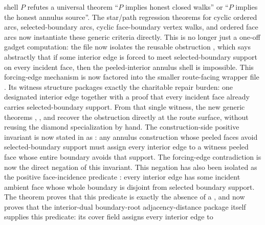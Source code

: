 \documentclass[11pt]{article}
\begin{document}
shell $P$ refutes a universal theorem ``$P$ implies honest closed walks'' or
``$P$ implies the honest annulus source''.  The star/path regression theorems
for cyclic ordered arcs, selected-boundary arcs, cyclic face-boundary vertex
walks, and ordered face arcs now instantiate these generic criteria directly.
This is no longer just a one-off gadget computation: the file now isolates
the reusable obstruction
,
which says abstractly that if some interior edge is forced to meet
selected-boundary support on every incident face, then the peeled-interior
annulus shell is impossible.
This forcing-edge mechanism is now factored into the smaller route-facing
wrapper file .  Its witness
structure  packages exactly the charitable
repair burden: one designated interior edge together with a proof that every
incident face already carries selected-boundary support.  From that single
witness, the new generic theorems
,
,
and
recover the obstruction directly at the route surface, without reusing the
diamond specialization by hand.  The construction-side positive invariant is
now stated in  as
:
any annulus construction whose peeled faces avoid selected-boundary support
must assign every interior edge to a witness peeled face whose entire boundary
avoids that support.  The forcing-edge contradiction is now the direct negation
of this invariant.  This negation has also been isolated as the positive
face-incidence predicate
: every interior edge has
some incident ambient face whose whole boundary is disjoint from selected
boundary support.  The theorem
proves that this predicate is exactly the absence of a
, and
now proves that the interior-dual boundary-root adjacency-distance package
itself supplies this predicate: its cover field assigns every interior edge to
\end{document}
